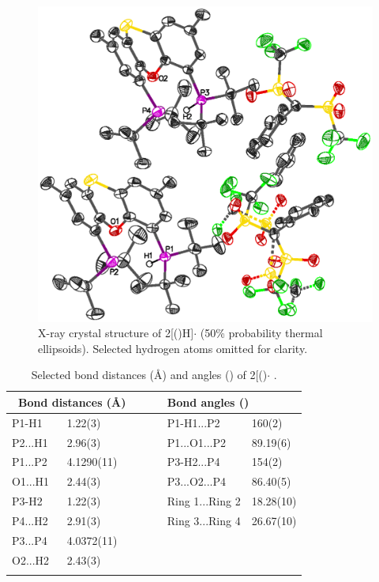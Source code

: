 \begin{figure}[hp!]
\begin{center}
\includegraphics{../Crystalstructures/mrmnb.eps}
\caption[X-ray crystal structure of {[}(\tButhixantphos)H{]}]{X-ray crystal structure of 2{[}(\tButhixantphos)H{]}$\cdot{}$  (50\% probability thermal ellipsoids).  Selected hydrogen atoms omitted for clarity.}
\label{Crystalprotonated}
\end{center}
\end{figure}

\begin{table}[htp]
\small
\caption[Selected bond distances (\AA) and angles (\degrees) of 2[(\tButhixantphos)\ce{H]CPh(SO2CF3)2}$\cdot{}$ ]{Selected bond distances (\AA) and angles (\degrees) of 2[(\tButhixantphos)\-\ce{H]CPh(SO2CF3)2}$\cdot{}$ .}
\vspace{1em}
\label{table:crystalprotonated:lengths}
\begin{center}
\begin{tabular}{l l l l l}
	\toprule
	\multicolumn{2}{l}{\bfseries{~Bond distances (\si{\angstrom})}} &~~~& \multicolumn{2}{l}{\bfseries{Bond angles (\degrees)}} \\
	\midrule		
	P1-H1	& 1.22(3)		&~~~& P1-H1...P2	& 160(2)\\
	P2...H1	& 2.96(3)		&~~~& P1...O1...P2	& 89.19(6)\\
	P1...P2	& 4.1290(11)	&~~~& P3-H2...P4	& 154(2)\\
	O1...H1	& 2.44(3)		&~~~& P3...O2...P4	& 86.40(5)\\
	P3-H2	& 1.22(3)		&~~~& Ring 1...Ring 2 & 18.28(10)\\
	P4...H2	& 2.91(3)		&~~~& Ring 3...Ring 4 & 26.67(10)\\
	P3...P4	& 4.0372(11)	&~~~& ~			& ~\\
	O2...H2	& 2.43(3)		&~~~& ~			& ~\\
	\bottomrule{}
\end{tabular}
\end{center}
\end{table}

